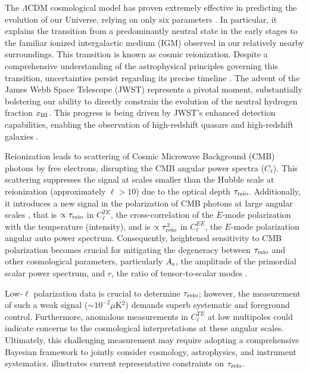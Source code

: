 The $\Lambda$CDM cosmological model has proven extremely effective in
predicting the evolution of our Universe, relying on only six parameters
\cite{Planck2020a}.
In particular, it explains the transition from a predominantly neutral
state in the early stages to the familiar ionized intergalactic medium
(IGM) observed in our relatively nearby surroundings.
This transition is known as cosmic reionization.
Despite a comprehensive understanding of the astrophysical principles
governing this transition, uncertainties persist regarding its precise
timeline \cite{Jin2023}.
The advent of the James Webb Space Telescope (JWST) \cite{Gardner2006}
represents a pivotal moment, substantially bolstering our ability to
directly constrain the evolution of the neutral hydrogen fraction
$x_{\mathrm{HI}}$.
This progress is being driven by JWST's enhanced detection
capabilities, enabling the observation of high-redshift quasars
\cite{Eilers2023} and high-redshift galaxies
\cite{Adams2023, Bradley2023, Donnan2023,Ning2024}.

Reionization leads to scattering of Cosmic Microwave Background (CMB)
photons by free electrons, disrupting the CMB angular power spectra
($C_\ell$).
This scattering suppresses the signal at scales smaller than the Hubble
scale at reionization (approximately $\ell>10$) \cite{Planck2020b} due
to the optical depth $\tau_{\mathrm{reio}}$.
Additionally, it introduces a new signal in the polarization of CMB
photons at large angular scales \cite{Planck2020a}, that is $\propto
\tau_{\mathrm{reio}}$ in $C^{TE}_\ell$, the cross-correlation of the $E$-mode
polarization with the temperature (intensity), and is $\propto
\tau_{\mathrm{reio}}^2$ in $C^{EE}_\ell$, the $E$-mode polarization angular auto
power spectrum.
Consequently, heightened sensitivity to CMB polarization becomes crucial
for mitigating the degeneracy between $\tau_{\mathrm{reio}}$ and other
cosmological parameters, particularly $A_\mathrm{s}$, the amplitude of the
primordial scalar power spectrum, and $r$, the ratio of tensor-to-scalar
modes \cite{Natale2020}.

Low-$\ell$ polarization data is crucial to determine $\tau_{\mathrm{reio}}$; however,
the measurement of such a weak signal ($\sim 10^{-2} \mu$K$^2$) demands
superb systematic and foreground control\cite{Planck2020b}. Furthermore,
anomalous measurements in $C^{TE}_\ell$ at low multipoles\cite{Planck2020a}
could indicate concerns to the cosmological interpretations at these angular scales.
Ultimately, this challenging measurement may require adopting a comprehensive
Bayesian framework to jointly consider cosmology, astrophysics, and
instrument systematics\cite{Paradiso2023}.  illustrates current
representative constraints on $\tau_{\mathrm{reio}}$.

